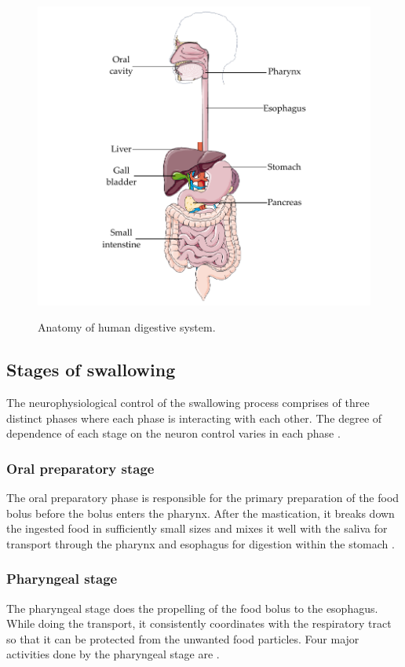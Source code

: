 \begin{figure}[bth]
	\myfloatalign
	{\includegraphics[width=\linewidth]{images/Ch2/fig1_Dig_sys}} \quad
	\caption[Anatomy of human digestive system.]{Anatomy of human digestive system.}\label{fig1_Dig_sys}
\end{figure}

\subsection{Stages of swallowing}
The neurophysiological control of the swallowing process comprises of three distinct phases where each phase is interacting with each other. The degree of dependence of each stage on the neuron control varies in each phase  \citep{lang2009brain}.

\subsubsection{Oral preparatory stage}
The oral preparatory phase is responsible for the primary preparation of the food bolus before the bolus enters the pharynx. After the mastication, it breaks down the ingested food in sufficiently small sizes and mixes it well with the saliva for transport through the pharynx and esophagus for digestion within the stomach \citep{Miller1986}.

\subsubsection{Pharyngeal stage}
The pharyngeal stage does the propelling of the food bolus to the esophagus. While doing the transport, it consistently coordinates with the respiratory tract so that it can be protected from the unwanted food particles. Four major activities done by the pharyngeal stage are \citep{Miller1986}. 

